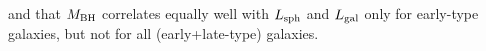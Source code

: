 \documentclass[preprint2]{emulateapj}
\begin{document}
and that $M_{\rm BH}$ correlates equally well with $L_{\rm sph}$ and $L_{\rm gal}$ only for early-type galaxies, but not for all (early+late-type) galaxies.
\end{document}
